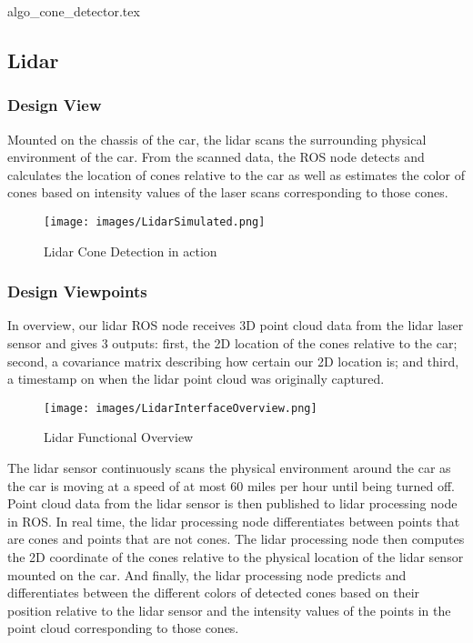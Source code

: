 \documentclass[10pt, onecolumn, draftclsnofoot, letterpaper,compsoc]{IEEEtran}
\begin{document}
\begin{algorithm}[H]
\caption{Cone Detector}
\label{alg:cameraConeDetector}
\begin{algorithmic}[1]
{algo_cone_detector.tex}
\end{algorithmic}
\end{algorithm}


\newpage

\subsection{Lidar}
\subsubsection{Design View} %
Mounted on the chassis of the car, the lidar scans the surrounding physical environment of the car. From the scanned data, the ROS node detects and calculates the location of cones relative to the car as well as estimates the color of cones based on intensity values of the laser scans corresponding to those cones.

\begin{figure}[htbp]
\centering
\label{fig:LidarInterfaceOverview}
\caption{Lidar Cone Detection in action}
\texttt{[image: images/LidarSimulated.png]}
\end{figure}

\subsubsection{Design Viewpoints} %
In overview, our lidar ROS node receives 3D point cloud data from the lidar laser sensor and gives 3 outputs: first, the 2D location of the cones relative to the car; second, a covariance matrix describing how certain our 2D location is; and third, a timestamp on when the lidar point cloud was originally captured. 

\begin{figure}[htbp]
\centering
\label{fig:LidarInterfaceOverview}
\caption{Lidar Functional Overview}
\texttt{[image: images/LidarInterfaceOverview.png]}
\end{figure}

The lidar sensor continuously scans the physical environment around the car as the car is moving at a speed of at most 60 miles per hour until being turned off. Point cloud data from the lidar sensor is then published to lidar processing node in ROS. In real time, the lidar processing node differentiates between points that are cones and points that are not cones. The lidar processing node then computes the 2D coordinate of the cones relative to the physical location of the lidar sensor mounted on the car. And finally, the lidar processing node predicts and differentiates between the different colors of detected cones based on their position relative to the lidar sensor and the intensity values of the points in the point cloud corresponding to those cones.
\end{document}
